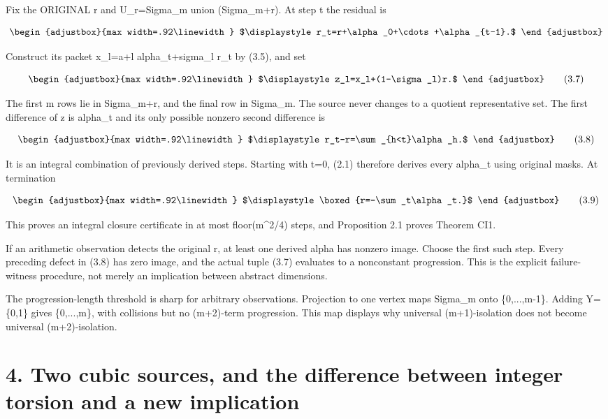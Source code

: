 Fix the ORIGINAL r and U\_r=Sigma\_m union (Sigma\_m+r). At step t the residual is

\[
\begin{adjustbox}{max width=.92\linewidth}
$\displaystyle r_t=r+\alpha_0+\cdots+\alpha_{t-1}.$
\end{adjustbox}
\]

Construct its packet x\_l=a+l alpha\_t+sigma\_l r\_t by (3.5), and set

\[
\begin{adjustbox}{max width=.92\linewidth}
$\displaystyle z_l=x_l+(1-\sigma_l)r.$
\end{adjustbox}
\tag{3.7}
\]

The first m rows lie in Sigma\_m+r, and the final row in Sigma\_m. The source never changes to a quotient representative set. The first difference of z is alpha\_t and its only possible nonzero second difference is

\[
\begin{adjustbox}{max width=.92\linewidth}
$\displaystyle r_t-r=\sum_{h<t}\alpha_h.$
\end{adjustbox}
\tag{3.8}
\]

It is an integral combination of previously derived steps. Starting with t=0, (2.1) therefore derives every alpha\_t using original masks. At termination

\[
\begin{adjustbox}{max width=.92\linewidth}
$\displaystyle \boxed{r=-\sum_t\alpha_t.}$
\end{adjustbox}
\tag{3.9}
\]

This proves an integral closure certificate in at most floor(m\^{}2/4) steps, and Proposition 2.1 proves Theorem CI1.

If an arithmetic observation detects the original r, at least one derived alpha has nonzero image. Choose the first such step. Every preceding defect in (3.8) has zero image, and the actual tuple (3.7) evaluates to a nonconstant progression. This is the explicit failure-witness procedure, not merely an implication between abstract dimensions.

The progression-length threshold is sharp for arbitrary observations. Projection to one vertex maps Sigma\_m onto \{0,...,m-1\}. Adding Y=\{0,1\} gives \{0,...,m\}, with collisions but no (m+2)-term progression. This map displays why universal (m+1)-isolation does not become universal (m+2)-isolation.

\section{4. Two cubic sources, and the difference between integer torsion and a new implication}\label{n18-two-cubic-sources-and-the-difference-between-integer-torsion-and-a-new-implication}

